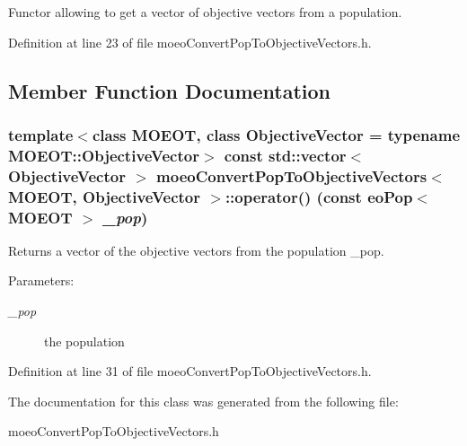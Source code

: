 Functor allowing to get a vector of objective vectors from a population. 



Definition at line 23 of file moeo\-Convert\-Pop\-To\-Objective\-Vectors.h.

\subsection{Member Function Documentation}
\subsubsection{\setlength{\rightskip}{0pt plus 5cm}template$<$class MOEOT, class Objective\-Vector = typename MOEOT::Objective\-Vector$>$ const std::vector$<$ Objective\-Vector $>$ \bf{moeo\-Convert\-Pop\-To\-Objective\-Vectors}$<$ MOEOT, Objective\-Vector $>$::operator() (const \bf{eo\-Pop}$<$ MOEOT $>$ {\em \_\-pop})\hspace{0.3cm}{\tt  [inline]}}\label{classmoeoConvertPopToObjectiveVectors_8fada75aa151a6eaa310c5064f783c86}


Returns a vector of the objective vectors from the population \_\-pop. 

\begin{Desc}
\item[Parameters:]
\begin{description}
\item[{\em \_\-pop}]the population \end{description}
\end{Desc}


Definition at line 31 of file moeo\-Convert\-Pop\-To\-Objective\-Vectors.h.

The documentation for this class was generated from the following file:\begin{CompactItemize}
\item 
moeo\-Convert\-Pop\-To\-Objective\-Vectors.h\end{CompactItemize}
